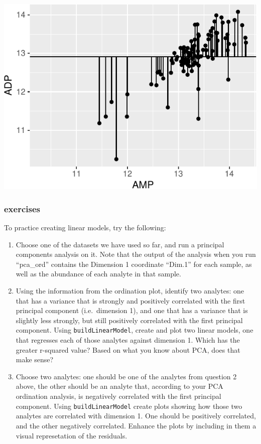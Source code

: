 \documentclass[
]{krantz}
\begin{document}
\begin{center}\includegraphics[width=0.8\linewidth]{index_files/figure-latex/unnamed-chunk-130-1} \end{center}

\hypertarget{exercises-6}{%
\subsubsection{exercises}\label{exercises-6}}

To practice creating linear models, try the following:

\begin{enumerate}
\def\labelenumi{\arabic{enumi}.}
\item
  Choose one of the datasets we have used so far, and run a principal components analysis on it. Note that the output of the analysis when you run ``pca\_ord'' contains the Dimension 1 coordinate ``Dim.1'' for each sample, as well as the abundance of each analyte in that sample.
\item
  Using the information from the ordination plot, identify two analytes: one that has a variance that is strongly and positively correlated with the first principal component (i.e.~dimension 1), and one that has a variance that is slightly less strongly, but still positively correlated with the first principal component. Using \texttt{buildLinearModel}, create and plot two linear models, one that regresses each of those analytes against dimension 1. Which has the greater r-squared value? Based on what you know about PCA, does that make sense?
\item
  Choose two analytes: one should be one of the analytes from question 2 above, the other should be an analyte that, according to your PCA ordination analysis, is negatively correlated with the first principal component. Using \texttt{buildLinearModel} create plots showing how those two analytes are correlated with dimension 1. One should be positively correlated, and the other negatively correlated. Enhance the plots by including in them a visual represetation of the residuals.
\end{enumerate}
\end{document}
